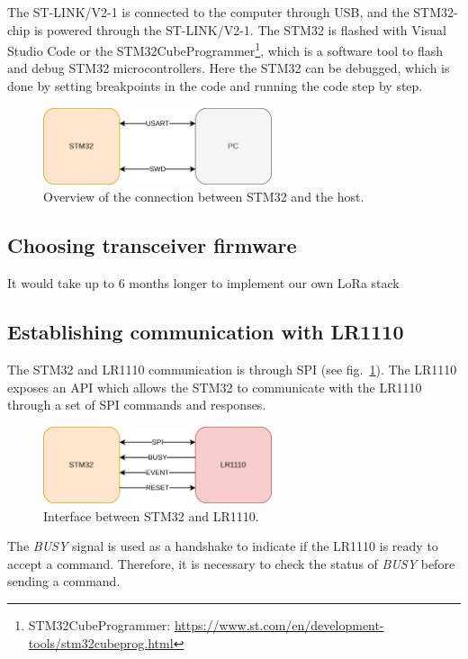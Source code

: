 The ST-LINK/V2-1 is connected to the computer through \ac{USB}, and the STM32-chip is powered through the ST-LINK/V2-1. The STM32 is flashed with Visual Studio Code or the STM32CubeProgrammer\footnote{STM32CubeProgrammer: \url{https://www.st.com/en/development-tools/stm32cubeprog.html}}, which is a software tool to flash and debug STM32 microcontrollers. Here the STM32 can be debugged, which is done by setting breakpoints in the code and running the code step by step.

\begin{figure}[H]
    \centering
    \includegraphics[width=0.6\textwidth]{figures/STM32_interface.png}
    \caption{Overview of the connection between STM32 and the host.}
\end{figure}

\subsection{Choosing transceiver firmware}
It would take up to 6 months longer to implement our own \ac{LoRa} stack

\subsection{Establishing communication with LR1110}
The STM32 and LR1110 communication is through \ac{SPI} (see fig.~\ref{fig:stm32_lr1110_interface}). The LR1110 exposes an \ac{API} which allows the STM32 to communicate with the LR1110 through a set of \ac{SPI} commands and responses.

\begin{figure}[H]
    \centering
    \includegraphics[width=0.6\textwidth]{figures/STM32_LR1110_interface.png}
    \caption{Interface between STM32 and LR1110.}
    \label{fig:stm32_lr1110_interface}
\end{figure}

The \textit{BUSY} signal is used as a handshake to indicate if the LR1110 is ready to accept a command. Therefore, it is necessary to check the status of \textit{BUSY} before sending a command.

